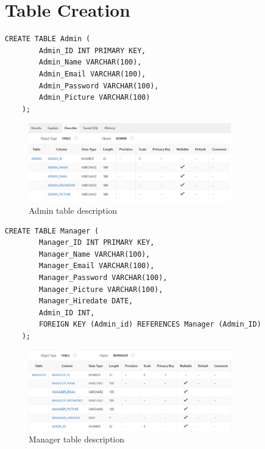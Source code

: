 \section{Table Creation}

\begin{lstlisting}[caption={Create Admin table}, label={lst:create_admin}]
    CREATE TABLE Admin (
        Admin_ID INT PRIMARY KEY,
        Admin_Name VARCHAR(100),
        Admin_Email VARCHAR(100),
        Admin_Password VARCHAR(100),
        Admin_Picture VARCHAR(100)
    );
    \end{lstlisting}

\begin{figure}[h]
    \centering
    \includegraphics[width=0.8\textwidth]{images/TableDesc/ADMIN.png}
    \caption{Admin table description}
    \label{fig:admin_table}
\end{figure}

\begin{lstlisting}[caption={Create Manager table}, label={lst:create_manager}]
    CREATE TABLE Manager (
        Manager_ID INT PRIMARY KEY,
        Manager_Name VARCHAR(100),
        Manager_Email VARCHAR(100),
        Manager_Password VARCHAR(100),
        Manager_Picture VARCHAR(100),
        Manager_Hiredate DATE,
        Admin_ID INT,
        FOREIGN KEY (Admin_id) REFERENCES Manager (Admin_ID)
    );
    \end{lstlisting}

\begin{figure}[h]
    \centering
    \includegraphics[width=0.8\textwidth]{images/TableDesc/MANAGER.png}
    \caption{Manager table description}
    \label{fig:manger_table}
\end{figure}

